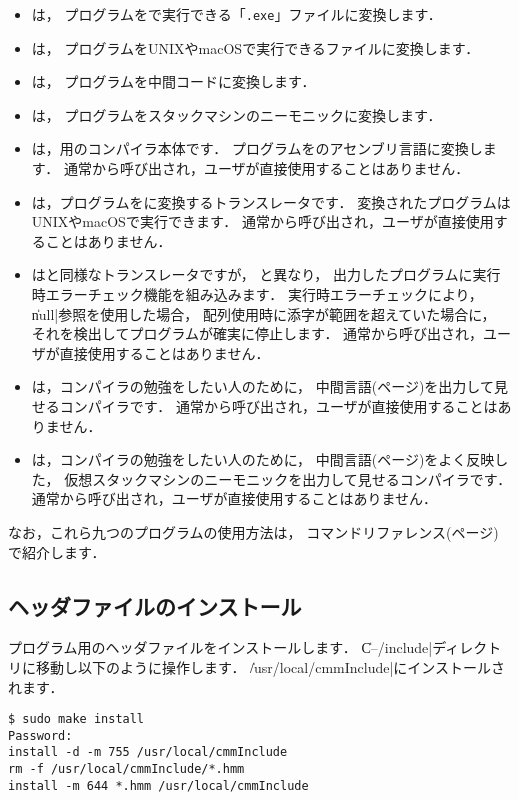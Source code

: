 \begin{itemize}
\item {\cme}は，
{\cmm}プログラムを{\tac}で実行できる「{\tt .exe}」ファイルに変換します．
\item {\cmc}は，
{\cmm}プログラムをUNIXやmacOSで実行できるファイルに変換します．
\item {\cmi}は，
{\cmm}プログラムを中間コードに変換します．
\item {\cmv}は，
{\cmm}プログラムをスタックマシンのニーモニックに変換します．
\item {\cmmc}は，{\tac}用の{\cmml}コンパイラ本体です．
{\cmm}プログラムを{\tac}のアセンブリ言語に変換します．
通常{\cme}から呼び出され，ユーザが直接使用することはありません．
\item {\ccmmc}は，{\cmm}プログラムを{\cl}に変換するトランスレータです．
変換された{\cl}プログラムはUNIXやmacOSで実行できます．
通常{\cmc}から呼び出され，ユーザが直接使用することはありません．
\item {\rtccmmc}は{\ccmmc}と同様なトランスレータですが，
{\ccmmc}と異なり，
出力したプログラムに実行時エラーチェック機能を組み込みます．
実行時エラーチェックにより，
\|null|参照を使用した場合，
配列使用時に添字が範囲を超えていた場合に，
それを検出してプログラムが確実に停止します．
通常{\cmc}から呼び出され，ユーザが直接使用することはありません．
\item {\icmmc}は，コンパイラの勉強をしたい人のために，
中間言語(\pageref{app:vm}ページ)を出力して見せるコンパイラです．
通常{\cmi}から呼び出され，ユーザが直接使用することはありません．
\item {\vcmmc}は，コンパイラの勉強をしたい人のために，
中間言語(\pageref{app:vm}ページ)をよく反映した，
仮想スタックマシンのニーモニックを出力して見せるコンパイラです．
通常{\cmv}から呼び出され，ユーザが直接使用することはありません．
\end{itemize}

なお，これら九つのプログラムの使用方法は，
コマンドリファレンス(\pageref{app:command}ページ)で紹介します．

\subsection{ヘッダファイルのインストール}

{\cmml}プログラム用のヘッダファイルをインストールします．
\|C--/include|ディレクトリに移動し以下のように操作します．
\|/usr/local/cmmInclude|にインストールされます．

\begin{mylist}
\begin{verbatim}
$ sudo make install
Password:
install -d -m 755 /usr/local/cmmInclude
rm -f /usr/local/cmmInclude/*.hmm
install -m 644 *.hmm /usr/local/cmmInclude
\end{verbatim}
\end{mylist}

